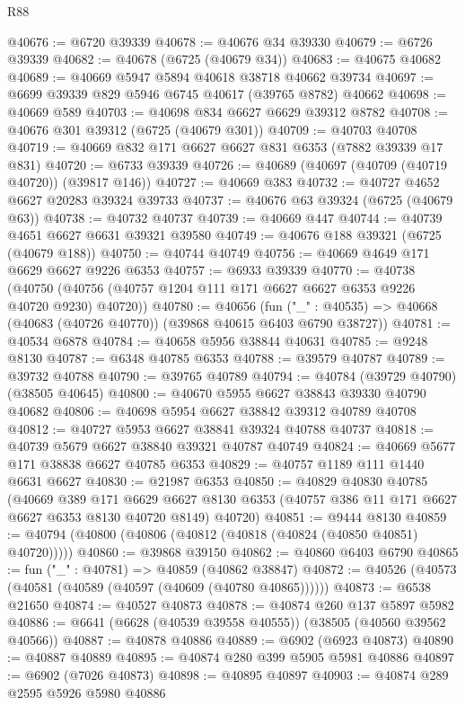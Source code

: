 \begin{lexlean}{R88}
\begin{coremodule}
@40676 := @6720 @39339
@40678 := @40676 @34 @39330
@40679 := @6726 @39339
@40682 := @40678 (@6725 (@40679 @34))
@40683 := @40675 @40682
@40689 := @40669 @5947 @5894 @40618 @38718 @40662 @39734
@40697 := @6699 @39339 @829 @5946 @6745 @40617 (@39765 @8782) @40662
@40698 := @40669 @589
@40703 := @40698 @834 @6627 @6629 @39312 @8782
@40708 := @40676 @301 @39312 (@6725 (@40679 @301))
@40709 := @40703 @40708
@40719 := @40669 @832 @171 @6627 @6627 @831 @6353 (@7882 @39339 @17 @831)
@40720 := @6733 @39339
@40726 := @40689 (@40697 (@40709 (@40719 @40720)) (@39817 @146))
@40727 := @40669 @383
@40732 := @40727 @4652 @6627 @20283 @39324 @39733
@40737 := @40676 @63 @39324 (@6725 (@40679 @63))
@40738 := @40732 @40737
@40739 := @40669 @447
@40744 := @40739 @4651 @6627 @6631 @39321 @39580
@40749 := @40676 @188 @39321 (@6725 (@40679 @188))
@40750 := @40744 @40749
@40756 := @40669 @4649 @171 @6629 @6627 @9226 @6353
@40757 := @6933 @39339
@40770 := @40738
    (@40750 (@40756 (@40757 @1204 @111 @171 @6627 @6627 @6353 @9226 @40720 @9230) @40720))
@40780 := @40656
    (fun ("_" : @40535) => @40668 (@40683 (@40726 @40770)) (@39868 @40615 @6403 @6790 @38727))
@40781 := @40534 @6878
@40784 := @40658 @5956 @38844 @40631
@40785 := @9248 @8130
@40787 := @6348 @40785 @6353
@40788 := @39579 @40787
@40789 := @39732 @40788
@40790 := @39765 @40789
@40794 := @40784 (@39729 @40790) (@38505 @40645)
@40800 := @40670 @5955 @6627 @38843 @39330 @40790 @40682
@40806 := @40698 @5954 @6627 @38842 @39312 @40789 @40708
@40812 := @40727 @5953 @6627 @38841 @39324 @40788 @40737
@40818 := @40739 @5679 @6627 @38840 @39321 @40787 @40749
@40824 := @40669 @5677 @171 @38838 @6627 @40785 @6353
@40829 := @40757 @1189 @111 @1440 @6631 @6627
@40830 := @21987 @6353
@40850 := @40829
    @40830
    @40785
    (@40669
      @389
      @171
      @6629
      @6627
      @8130
      @6353
      (@40757 @386 @11 @171 @6627 @6627 @6353 @8130 @40720 @8149)
      @40720)
@40851 := @9444 @8130
@40859 := @40794 (@40800 (@40806 (@40812 (@40818 (@40824 (@40850 @40851) @40720)))))
@40860 := @39868 @39150
@40862 := @40860 @6403 @6790
@40865 := fun ("_" : @40781) => @40859 (@40862 @38847)
@40872 := @40526 (@40573 (@40581 (@40589 (@40597 (@40609 (@40780 @40865))))))
@40873 := @6538 @21650
@40874 := @40527 @40873
@40878 := @40874 @260 @137 @5897 @5982
@40886 := @6641 (@6628 (@40539 @39558 @40555)) (@38505 (@40560 @39562 @40566))
@40887 := @40878 @40886
@40889 := @6902 (@6923 @40873)
@40890 := @40887 @40889
@40895 := @40874 @280 @399 @5905 @5981 @40886
@40897 := @6902 (@7026 @40873)
@40898 := @40895 @40897
@40903 := @40874 @289 @2595 @5926 @5980 @40886

\end{coremodule}
\end{lexlean}
